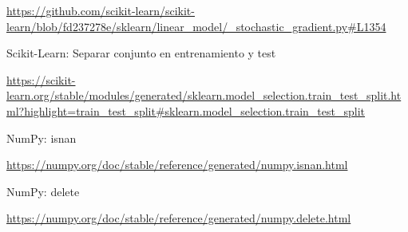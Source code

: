 \documentclass[12pt, spanish]{article}
\begin{document}
\begin{thebibliography}{9}
\url{https://github.com/scikit-learn/scikit-learn/blob/fd237278e/sklearn/linear_model/_stochastic_gradient.py#L1354}



Scikit-Learn: Separar conjunto en entrenamiento y test

\url{https://scikit-learn.org/stable/modules/generated/sklearn.model_selection.train_test_split.html?highlight=train_test_split#sklearn.model_selection.train_test_split}


NumPy: isnan

\url{https://numpy.org/doc/stable/reference/generated/numpy.isnan.html}

NumPy: delete

\url{https://numpy.org/doc/stable/reference/generated/numpy.delete.html}


\end{thebibliography}
\end{document}
